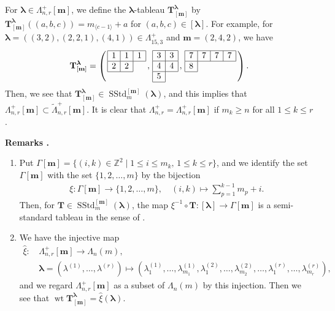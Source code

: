 \documentclass[12pt]{amsart}
\def \remarks{\refstepcounter{thm} \par\medskip\noindent
                \textbf{Remarks \thethm .} }
\numberwithin{equation}{thm}
\newcommand\ZZ{\mathbb Z}
\newcommand\bT{\mathbf T}
\renewcommand\bm{\mathbf m} %
\newcommand\la{\lambda}
\newcommand\vG{\varGamma}
\newcommand\vL{\varLambda}
\newcommand\Bla{\boldsymbol\lambda}
\newcommand\wt{\widetilde}
\newcommand\ra{\rightarrow}
\newcommand\lan{\langle}
\newcommand\ran{\rangle}
\newcommand{\owt}{\operatorname{wt}}
\newcommand{\SStd}{\operatorname{SStd}}
\begin{document}
For $\Bla \in \vL_{n,r}^+[\bm]$, 
we define the $\Bla$-tableau $\bT^{\Bla}_{[\bm]}$ by 
$\bT_{[\bm]}^{\Bla}((a,b,c)) = m_{\lan c-1 \ran} +a$ 
for $(a,b,c) \in [\Bla]$. 
For  example, 
for $\Bla =((3,2), (2,2,1), (4,1)) \in \vL_{15,3}^+$ and $\bm=(2,4,2)$, we have 
\begin{align*}
\bT_{[\bm]}^{\Bla}
= \left( \, \begin{array}{|c|c|c|} \hline 1 & 1 & 1 \\ \hline 2 & 2 \\ \cline{1-2} \multicolumn{1}{c}{} \end{array} \, , 
	\, 
	\begin{array}{|c|c|c|} \hline 3 & 3 \\ \hline 4 & 4 \\ \hline 5 \\ \cline{1-1} \end{array} \, , 
	\, 
	\begin{array}{|c|c|c|c|} \hline 7 & 7 & 7 & 7 \\ \hline 8 \\ \cline{1-1} \multicolumn{1}{c}{} \end{array} 
	\, 
	\right). 
\end{align*}
%
Then, we see that $\bT_{[\bm]}^{\Bla} \in \SStd_m^{[\bm]} (\Bla)$, 
and this implies that $\vL_{n,r}^+[\bm] \subset \wt{\vL}_{n,r}^+[\bm]$.  
It is clear that 
$\vL_{n,r}^+ = \vL_{n,r}^+[\bm]$ if $m_k \geq n$ for all $1 \leq k \leq r$. 


\remarks\ 
\begin{enumerate} 
\item 
Put $\vG[\bm] =\{(i,k) \in \ZZ^2 \mid 1 \leq i \leq m_k, \, 1 \leq k \leq r\}$, 
and we identify the set $\vG[\bm]$ with the set $\{1,2, \dots, m\}$ by the bijection 
\begin{align*}
\xi : \vG[\bm] \ra \{1,2,\dots, m\}, \quad (i,k) \mapsto \sum_{p=1}^{k-1} m_p +i.
\end{align*}
Then, for $\bT \in \SStd_m^{[\bm]}(\Bla)$, 
the map $\xi^{-1} \circ \bT : [\Bla] \ra \vG[\bm]$ is a semi-standard tableau in the sense of \cite{DJM98}. 

\item 
We have the injective map 
\begin{align*}
\hat{\xi} : \, & \vL_{n,r}^+[\bm] \ra \vL_n(m), 
\\
&\Bla =(\la^{(1)}, \dots, \la^{(r)}) 
\mapsto ( \la^{(1)}_1,\dots, \la^{(1)}_{m_1}, \la_1^{(2)},\dots, \la_{m_2}^{(2)}, \dots, \la_1^{(r)}, \dots, \la_{m_r}^{(r)}), 
\end{align*}
and we regard $\vL_{n,r}^+[\bm]$ as a subset of $\vL_n(m)$ by this injection. 
Then we see that $\owt \bT_{[\bm]}^{\Bla} = \hat{\xi} (\Bla)$. 
\end{enumerate}
\end{document}
